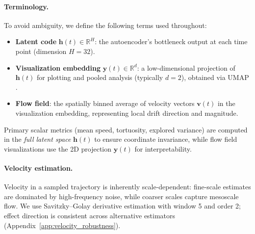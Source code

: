 \documentclass[5p,twocolumn,authoryear]{elsarticle}
\begin{document}
\paragraph{Terminology.}
To avoid ambiguity, we define the following terms used throughout:
\begin{itemize}
    \item \textbf{Latent code} $\mathbf{h}(t) \in \mathbb{R}^{H}$: the autoencoder's bottleneck output at each time point (dimension $H=32$).
    \item \textbf{Visualization embedding} $\mathbf{y}(t) \in \mathbb{R}^{d}$: a low-dimensional projection of $\mathbf{h}(t)$ for plotting and pooled analysis (typically $d=2$), obtained via UMAP \citep{McInnes2018}.
    \item \textbf{Flow field}: the spatially binned average of velocity vectors $\mathbf{v}(t)$ in the visualization embedding, representing local drift direction and magnitude.
\end{itemize}
Primary scalar metrics (mean speed, tortuosity, explored variance) are computed in the \emph{full latent space} $\mathbf{h}(t)$ to ensure coordinate invariance, while flow field visualizations use the 2D projection $\mathbf{y}(t)$ for interpretability.

\paragraph{Velocity estimation.}
Velocity in a sampled trajectory is inherently scale-dependent: fine-scale estimates are dominated by high-frequency noise, while coarser scales capture mesoscale flow. We use Savitzky--Golay derivative estimation \citep{SavitzkyGolay1964} with window 5 and order 2; effect direction is consistent across alternative estimators (Appendix~\ref{app:velocity_robustness}).
\end{document}
